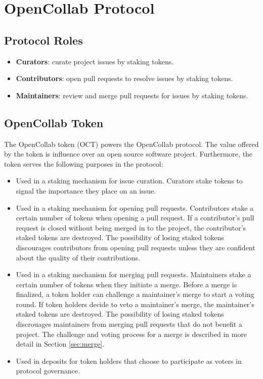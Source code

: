 \section{OpenCollab Protocol}
\label{sec:opencollab}

\subsection{Protocol Roles}

\begin{itemize}
  \item \textbf{Curators}: curate project issues by staking tokens.
  \item \textbf{Contributors}: open pull requests to resolve issues by staking tokens.
  \item \textbf{Maintainers}: review and merge pull requests for issues by
    staking tokens.
\end{itemize}

\subsection{OpenCollab Token}

The OpenCollab token (OCT) powers the OpenCollab protocol. The value offered by
the token is influence over an open source software project. Furthermore, the
token serves the following purposes in the protocol:

\begin{itemize}
  \item Used in a staking mechanism for issue curation. Curators stake tokens to
    signal the importance they place on an issue.
  \item Used in a staking mechanism for opening pull requests. Contributors
    stake a certain number of tokens when opening a pull request. If a
    contributor's pull request is closed without being merged in to the project,
    the contributor's staked tokens are destroyed. The possibility of losing
    staked tokens discourages contributors from opening pull requests unless
    they are confident about the quality of their contributions.
  \item Used in a staking mechanism for merging pull requests. Maintainers stake
    a certain number of tokens when they initiate a merge. Before a merge is
    finalized, a token holder can challenge a maintainer's merge to start a
    voting round. If token holders decide to veto a maintainer's merge, the
    maintainer's staked tokens are destroyed. The possibility of losing staked
    tokens discrouages maintainers from merging pull requests that do not
    benefit a project. The challenge and voting process for a merge is described
    in more detail in Section \ref{sec:merge}.
  \item Used in deposits for token holders that choose to participate as voters
    in protocol governance.
\end{itemize}

